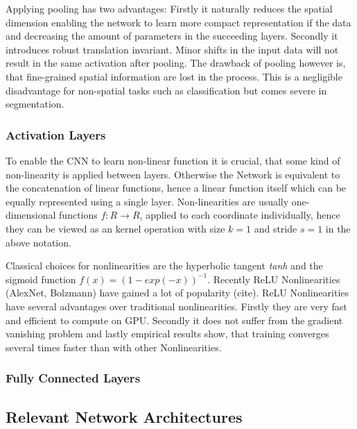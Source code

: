 Applying pooling has two  advantages: Firstly it naturally reduces the spatial dimension enabling the network to learn more compact representation if the data and decreasing the amount of parameters in the succeeding layers. Secondly it introduces robust translation invariant. Minor shifts in the input data will not result in the same activation after pooling. The drawback of pooling however is, that fine-grained spatial information are lost in the process. This is a negligible disadvantage for non-spatial tasks such as classification but comes severe in segmentation. 

 \subsubsection{Activation Layers}
 
 To enable the CNN to learn non-linear function it is crucial, that some kind of non-linearity is applied between layers. Otherwise the Network is equivalent to the concatenation of linear functions, hence a linear function itself which can be equally represented using a single layer. Non-linearities are usually one-dimensional functions $f: R \rightarrow R$, applied to each coordinate individually, hence they can be viewed as an kernel operation with size $k=1$ and stride $s=1$ in the above notation. 
 
Classical choices for nonlinearities are the hyperbolic tangent \emph{tanh} and the sigmoid function $f(x) = (1- exp(-x))^{-1}$. Recently ReLU Nonlinearities (AlexNet, Bolzmann) have gained a lot of popularity (cite). ReLU Nonlinearities have several advantages over traditional nonlinearities. Firstly they are very fast and efficient to compute on GPU. Secondly it does not suffer from the gradient vanishing problem and lastly empirical results show, that training converges several times faster than with other Nonlinearities.

\subsubsection{Fully Connected Layers}

\label{sec:fully_connected}

\subsection{Relevant Network Architectures}